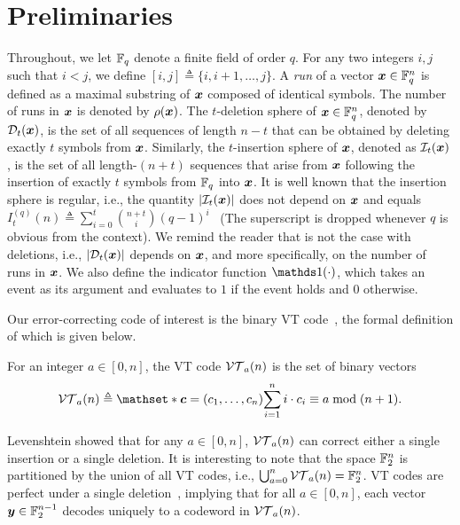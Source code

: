 \documentclass[conference, a4paper]{IEEEtran}
\begin{document}
\section{Preliminaries}

Throughout, we let $\mathbb{F}_q$ denote a finite field of order $q$. For any two integers $i,j$ such that $i < j$, we define $[i,j] \triangleq \{i,i+1,\ldots,j\}$. %
A \emph{run} of a vector ${\boldsymbol x}  \in \mathbb{F}_q^n$ is defined as a maximal substring of ${\boldsymbol x}$ composed of identical symbols. The number of runs in ${\boldsymbol x}$ is denoted by $\rho({\boldsymbol x})$. The $t$-deletion sphere of ${\boldsymbol x} \in \mathbb{F}_q^n$, denoted by $\mathcal{D}_{t}({\boldsymbol x})$, is  the set of all sequences of length $n-t$ that can be obtained by deleting exactly $t$ symbols from ${\boldsymbol x}$. Similarly, the $t$-insertion sphere of ${\boldsymbol x}$, denoted as $\mathcal{I}_{t}({\boldsymbol x})$, is the set of all length-$(n+t)$ sequences that arise from ${\boldsymbol x}$ following the insertion of exactly $t$ symbols from $\mathbb{F}_q$ into ${\boldsymbol x}$. 
It is well known that the insertion sphere is regular, i.e., the quantity  $|\mathcal{I}_{t}({\boldsymbol x})|$ does not depend on ${\boldsymbol x}$ and equals $I^{(q)}_t(n) \triangleq \sum_{i=0}^{t} \binom{n+t}{i} (q-1)^i$~\cite{levenshteinEfficientReconstructionSequences2001a} (The superscript is dropped whenever $q$ is obvious from the context). We remind the reader that is not the case with deletions, i.e., $|\mathcal{D}_{t}({\boldsymbol x})|$ depends on ${\boldsymbol x}$, and more specifically, on the number of runs in ${\boldsymbol x}$. We also define the indicator function $\indicator(\cdot)$, which takes an event as its argument and evaluates to $1$ if the event holds and $0$ otherwise.


Our error-correcting code of interest is the binary VT code~\cite{levenshtein1966binary}, the formal definition of which is given below.
\begin{definition} \label{def::vt-codes}
    For an integer $a \in [0,n]$, the VT code $\mathcal{VT}_{a}(n)$ is the set of binary vectors
    \begin{equation*}
        \vt{a}{n} \triangleq \mathset*{\bfc = (c_1,\ldots,c_n)}{\sum_{i=1}^{n} i\cdot c_i \equiv a \bmod{(n+1})}.
    \end{equation*}
\end{definition}

Levenshtein showed that for any $a \in [0,n]$, $\mathcal{VT}_{a}(n)$ can correct either a single insertion or a single deletion. It is interesting to note that the space $\mathbb{F}_2^n$ is partitioned by the union of all VT codes, i.e., $\bigcup_{a=0}^n \mathcal{VT}_{a}(n) = \mathbb{F}_2^n$. VT codes are perfect under a single deletion~\cite{sloaneSingleDeletionCorrectingCodes2002}, implying that for all $a \in [0,n]$, each vector ${\boldsymbol y} \in \mathbb{F}_2^{n-1}$ decodes uniquely to a codeword in $\mathcal{VT}_{a}(n)$.
\end{document}
